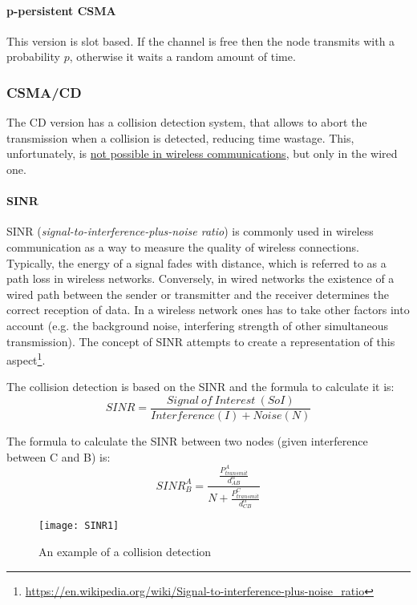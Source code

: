 \paragraph*{p-persistent CSMA} This version is slot based. If the channel is
free then the node transmits with a probability $p$, otherwise it waits a random
amount of time.

\subsubsection{CSMA/CD}

The CD version has a collision detection system, that allows to abort the
transmission when a collision is detected, reducing time wastage. This,
unfortunately, is \underline{not possible in wireless communications}, but only
in the wired one.

\paragraph*{SINR} SINR (\textit{signal-to-interference-plus-noise ratio})
is commonly used in wireless communication as a way to measure the quality of
wireless connections. Typically, the energy of a signal fades with distance,
which is referred to as a path loss in wireless networks.
Conversely, in wired networks the existence of a wired path between the sender
or transmitter and the receiver determines the correct reception of data. In a
wireless network ones has to take other factors into account (e.g. the
background noise, interfering strength of other simultaneous transmission). The
concept of SINR attempts to create a representation of this aspect\footnote{
\url{https://en.wikipedia.org/wiki/Signal-to-interference-plus-noise_ratio}
}.

The collision detection is based on the SINR and the formula to calculate it is:
\begin{equation}
SINR = \frac{Signal\ of\ Interest\ (SoI)}{Interference(I) + Noise(N)}
\end{equation}

The formula to calculate the SINR between two nodes (given interference between
C and B) is:
\begin{equation}
SINR^{A}_{B} = \frac{\frac{P^{A}_{transmit}}{d^{\alpha}_{AB}}}{N + \frac{P^{C}_{transmit}}{d^{\alpha}_{CB}}}
\end{equation}

\begin{figure}[t]
  \centering
  \texttt{[image: SINR1]}
  \caption{An example of a collision detection}
\end{figure}

